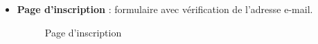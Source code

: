 \documentclass[12pt]{report}
\begin{document}
\begin{itemize}
		\item \textbf{Page d'inscription} : formulaire avec vérification de l’adresse e-mail.
		
		\begin{figure}[H]
			\centering
			\begin{minipage}[t]{0.5\textwidth}
				\centering
				\caption{Page d'inscription}
			\end{minipage}
		\end{figure}
		

\end{itemize}
\end{document}

